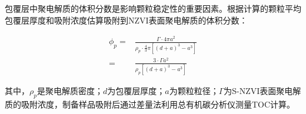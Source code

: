 包覆层中聚电解质的体积分数是影响颗粒稳定性的重要因素。根据计算的颗粒平均包覆层厚度和吸附浓度估算吸附到NZVI表面聚电解质的体积分数：

\begin{align}
    \phi_p=& \frac{\Gamma\cdot 4\pi a^2}{\rho_p\cdot \frac{4}{3}\pi [(d+a)^3-a^3]}  \\
    =&\frac{3\cdot\Gamma a^2}{\rho_p[(d+a)^3-a^3]} \nonumber
\end{align}

其中，$\rho_p$是聚电解质密度；$d$为包覆层厚度；$a$为颗粒粒径；$\Gamma$为S-NZVI表面聚电解质的吸附浓度，制备样品吸附后通过差量法利用总有机碳分析仪测量TOC计算。

